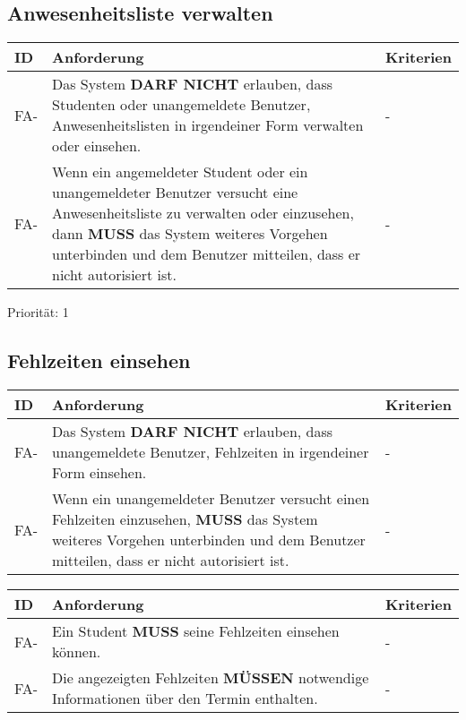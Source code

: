 \newpage

\subsection{Anwesenheitsliste verwalten}

\begin{tabular} {|p{}|p{11cm}|p{}|}
	\hline
	ID & Anforderung & Kriterien \\
	\hline
	FA-
	& Das System \textbf{DARF NICHT} erlauben, dass Studenten oder unangemeldete Benutzer, Anwesenheitslisten in irgendeiner Form verwalten oder einsehen. 
	& - \\
	\hline
	FA-
	& Wenn ein angemeldeter Student oder ein unangemeldeter Benutzer versucht eine Anwesenheitsliste zu verwalten oder einzusehen, dann \textbf{MUSS} das System weiteres Vorgehen unterbinden und dem Benutzer mitteilen, dass er nicht autorisiert ist.
	& - \\ 
	\hline
\end{tabular}
Priorität: 1

\newpage

\subsection{Fehlzeiten einsehen}

\begin{tabular} {|p{}|p{11cm}|p{}|}
	\hline
	ID & Anforderung & Kriterien \\
	\hline
	FA-
	& Das System \textbf{DARF NICHT} erlauben, dass unangemeldete Benutzer, Fehlzeiten in irgendeiner Form einsehen. 
	& - \\
	\hline
	FA-
	& Wenn ein unangemeldeter Benutzer versucht einen Fehlzeiten einzusehen, \textbf{MUSS} das System weiteres Vorgehen unterbinden und dem Benutzer mitteilen, dass er nicht autorisiert ist.
	& - \\ 
	\hline
\end{tabular}

\begin{tabular} {|p{}|p{11cm}|p{}|}
	\hline
	ID & Anforderung & Kriterien \\
	\hline
	FA-
	& Ein Student \textbf{MUSS} seine Fehlzeiten einsehen können. 
	& - \\
	\hline
	FA-
	& Die angezeigten Fehlzeiten \textbf{MÜSSEN} notwendige Informationen über den Termin enthalten.
	& - \\ 
	\hline
\end{tabular}

